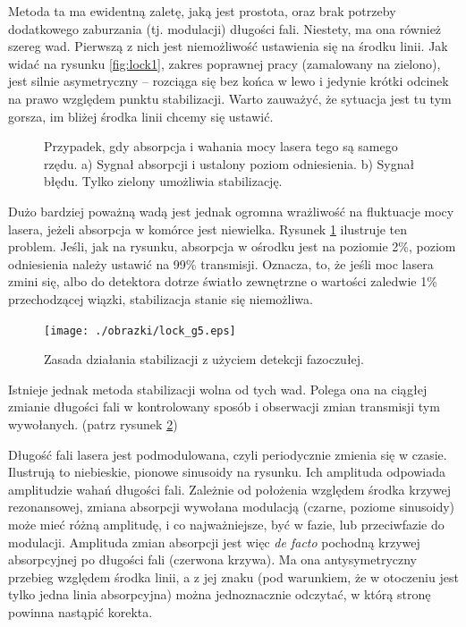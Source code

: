 \documentclass[a4paper,10pt]{article}
\begin{document}
Metoda ta ma ewidentną zaletę, jaką jest prostota, oraz brak potrzeby dodatkowego zaburzania (tj. modulacji) długości fali.
Niestety, ma ona również szereg wad. Pierwszą z nich jest niemożliwość ustawienia się na środku linii. Jak widać na
rysunku \ref{fig:lock1}, zakres poprawnej pracy (zamalowany na zielono), jest silnie asymetryczny -- rozciąga się 
bez końca w lewo i jedynie krótki odcinek na prawo względem punktu stabilizacji. Warto zauważyć, że sytuacja jest tu tym gorsza, im
bliżej środka linii chcemy się ustawić.

\begin{figure}
\caption{Przypadek, gdy absorpcja i wahania mocy lasera tego są samego rzędu. a) Sygnał absorpcji i ustalony poziom odniesienia. b) Sygnał błędu. Tylko zielony umożliwia stabilizację. }
\label{fig:lock2}
\end{figure} 


Dużo bardziej poważną wadą jest jednak ogromna wrażliwość na fluktuacje mocy lasera, jeżeli absorpcja w komórce jest niewielka.
Rysunek \ref{fig:lock2} ilustruje ten problem. Jeśli, jak na rysunku, absorpcja w ośrodku jest na poziomie 2\%, poziom odniesienia
należy ustawić na 99\% transmisji. Oznacza, to, że jeśli moc lasera zmini się, albo do detektora dotrze światło zewnętrzne o wartości
zaledwie 1\% przechodzącej wiązki, stabilizacja stanie się niemożliwa.

\begin{figure}

\texttt{[image: ./obrazki/lock\_g5.eps]}
\caption{Zasada działania stabilizacji z użyciem detekcji fazoczułej.}
\label{fig:lock3}
\end{figure} 

Istnieje jednak metoda stabilizacji wolna od tych wad.
Polega ona na ciągłej zmianie długości fali w kontrolowany sposób i obserwacji zmian transmisji tym wywołanych. (patrz rysunek \ref{fig:lock3})

 Długość fali lasera jest podmodulowana, czyli periodycznie zmienia się w czasie. Ilustrują to niebieskie, pionowe sinusoidy na rysunku. Ich amplituda odpowiada amplitudzie wahań długości fali.
  Zależnie od położenia względem środka krzywej rezonansowej, zmiana absorpcji wywołana modulacją (czarne, poziome sinusoidy) może mieć
 różną amplitudę, i co najważniejsze, być w fazie, lub przeciwfazie do modulacji.
  Amplituda zmian absorpcji jest więc \textit{de facto} pochodną krzywej absorpcyjnej po długości fali (czerwona krzywa). 
  Ma ona antysymetryczny przebieg względem środka linii, a z jej znaku (pod warunkiem, że w otoczeniu jest tylko jedna linia absorpcyjna)
 można jednoznacznie odczytać, w którą stronę powinna nastąpić korekta.
 
\end{document}
